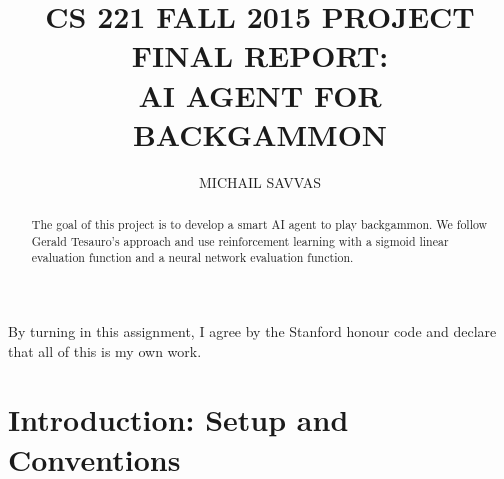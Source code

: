 \documentclass[11pt, a4paper, twoside]{amsart} %
\author{\footnotesize{MICHAIL SAVVAS}}
\date{}
\title{\textbf{CS 221 FALL 2015 PROJECT FINAL REPORT:\\ AI AGENT FOR BACKGAMMON}}
\theoremstyle{definition}
\begin{document}
\maketitle

\begin{abstract}
\vspace*{-1cm} The goal of this project is to develop a smart AI agent to play backgammon. We follow Gerald Tesauro's approach and use reinforcement learning with a sigmoid linear evaluation function and a neural network evaluation function.\\
\end{abstract}

By turning in this assignment, I agree by the Stanford honour code and declare
that all of this is my own work.

\section{Introduction: Setup and Conventions}
\end{document}

